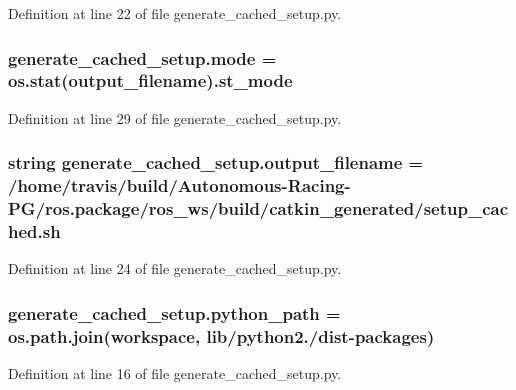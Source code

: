 Definition at line 22 of file generate\+\_\+cached\+\_\+setup.\+py.

\subsubsection[{\texorpdfstring{mode}{mode}}]{\setlength{\rightskip}{0pt plus 5cm}generate\+\_\+cached\+\_\+setup.\+mode = os.\+stat({\bf output\+\_\+filename}).st\+\_\+mode}\hypertarget{namespacegenerate__cached__setup_a10081e5abedae9bd46dd91202096e789}{}\label{namespacegenerate__cached__setup_a10081e5abedae9bd46dd91202096e789}


Definition at line 29 of file generate\+\_\+cached\+\_\+setup.\+py.

\subsubsection[{\texorpdfstring{output\+\_\+filename}{output_filename}}]{\setlength{\rightskip}{0pt plus 5cm}string generate\+\_\+cached\+\_\+setup.\+output\+\_\+filename = \textquotesingle{}/home/travis/build/Autonomous-\/Racing-\/PG/ros.\+package/ros\+\_\+ws/build/catkin\+\_\+generated/setup\+\_\+cached.\+sh\textquotesingle{}}\hypertarget{namespacegenerate__cached__setup_a0265aee5075ee1eb701ff69c98ad6793}{}\label{namespacegenerate__cached__setup_a0265aee5075ee1eb701ff69c98ad6793}


Definition at line 24 of file generate\+\_\+cached\+\_\+setup.\+py.

\subsubsection[{\texorpdfstring{python\+\_\+path}{python_path}}]{\setlength{\rightskip}{0pt plus 5cm}generate\+\_\+cached\+\_\+setup.\+python\+\_\+path = os.\+path.\+join(workspace, \textquotesingle{}lib/python2./dist-\/packages\textquotesingle{})}\hypertarget{namespacegenerate__cached__setup_a72579fd01529a79bab20d99291889d3f}{}\label{namespacegenerate__cached__setup_a72579fd01529a79bab20d99291889d3f}


Definition at line 16 of file generate\+\_\+cached\+\_\+setup.\+py.

